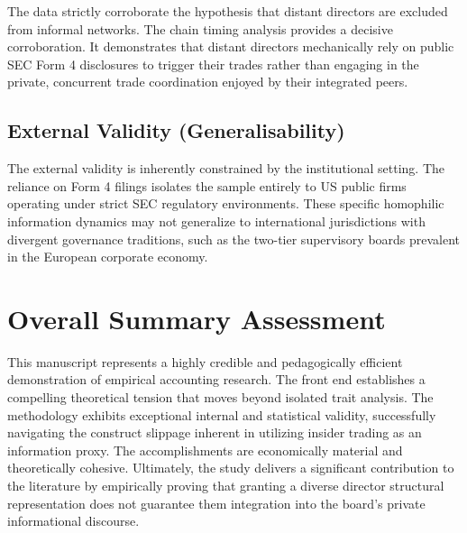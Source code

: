 \documentclass[11pt, a4paper]{article}
\begin{document}
The data strictly corroborate the hypothesis that distant directors are excluded from informal networks. The chain timing analysis provides a decisive corroboration. It demonstrates that distant directors mechanically rely on public SEC Form 4 disclosures to trigger their trades rather than engaging in the private, concurrent trade coordination enjoyed by their integrated peers.

\subsection*{External Validity (Generalisability)}
The external validity is inherently constrained by the institutional setting. The reliance on Form 4 filings isolates the sample entirely to US public firms operating under strict SEC regulatory environments. These specific homophilic information dynamics may not generalize to international jurisdictions with divergent governance traditions, such as the two-tier supervisory boards prevalent in the European corporate economy.

\section*{Overall Summary Assessment}
This manuscript represents a highly credible and pedagogically efficient demonstration of empirical accounting research. The front end establishes a compelling theoretical tension that moves beyond isolated trait analysis. The methodology exhibits exceptional internal and statistical validity, successfully navigating the construct slippage inherent in utilizing insider trading as an information proxy. The accomplishments are economically material and theoretically cohesive. Ultimately, the study delivers a significant contribution to the literature by empirically proving that granting a diverse director structural representation does not guarantee them integration into the board's private informational discourse.



\end{document}
